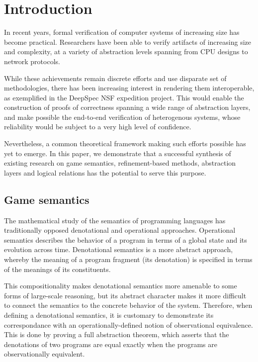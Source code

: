 \section{Introduction}

In recent years,
formal verification of computer systems
of increasing size has become practical.
Researchers have been able to verify artifacts of
increasing size and complexity,
at a variety of abstraction levels spanning
from CPU designs to network protocols.

While these achievements remain discrete efforts and
use disparate set of methodologies,
there has been increasing interest in rendering them interoperable,
as exemplified in the DeepSpec NSF expedition project.
This would enable the construction of proofs of correctness
spanning a wide range of abstraction layers,
and make possible the end-to-end verification of heterogenous systems,
whose reliability would be subject to a very high level of confidence.

Nevertheless,
a common theoretical framework
making such efforts possible has yet to emerge.
In this paper,
we demonstrate that a successful synthesis of existing research on
game semantics,
refinement-based methods,
abstraction layers and
logical relations
has the potential to serve this purpose.

\subsection{Game semantics} %

The mathematical study of the semantics of programming languages
has traditionally opposed denotational and operational approaches.
Operational semantics describes
the behavior of a program in terms of
a global state and its evolution across time.
Denotational semantics is a more abstract approach,
whereby the meaning of a program fragment (its denotation)
is specified in terms of the meanings of its constituents.

This compositionality makes denotational semantics
more amenable to some forms of large-scale reasoning,
but its abstract character makes it more difficult
to connect the semantics to the concrete behavior of the system.
Therefore, when defining a denotational semantics,
it is customary to demonstrate its correspondance
with an operationally-defined notion of observational equivalence.
This is done by proving a full abstraction theorem,
which asserts that the denotations of two programs
are equal exactly when the programs are observationally equivalent.

